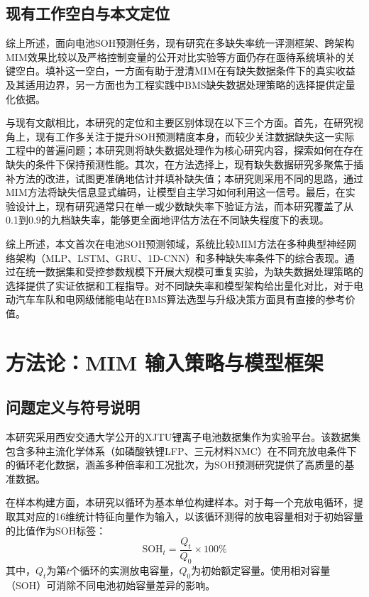 \documentclass[10pt,a4paper]{ctexart}
\begin{document}
\subsection{现有工作空白与本文定位}

综上所述，面向电池SOH预测任务，现有研究在多缺失率统一评测框架、跨架构MIM效果比较以及严格控制变量的公开对比实验等方面仍存在亟待系统填补的关键空白。填补这一空白，一方面有助于澄清MIM在有缺失数据条件下的真实收益及其适用边界，另一方面也为工程实践中BMS缺失数据处理策略的选择提供定量化依据。

与现有文献相比，本研究的定位和主要区别体现在以下三个方面。首先，在研究视角上，现有工作多关注于提升SOH预测精度本身，而较少关注数据缺失这一实际工程中的普遍问题；本研究则将缺失数据处理作为核心研究内容，探索如何在存在缺失的条件下保持预测性能。其次，在方法选择上，现有缺失数据研究多聚焦于插补方法的改进，试图更准确地估计并填补缺失值；本研究则采用不同的思路，通过MIM方法将缺失信息显式编码，让模型自主学习如何利用这一信号。最后，在实验设计上，现有研究通常只在单一或少数缺失率下验证方法，而本研究覆盖了从0.1到0.9的九档缺失率，能够更全面地评估方法在不同缺失程度下的表现。

综上所述，本文首次在电池SOH预测领域，系统比较MIM方法在多种典型神经网络架构（MLP、LSTM、GRU、1D-CNN）和多种缺失率条件下的综合表现。通过在统一数据集和受控参数规模下开展大规模可重复实验，为缺失数据处理策略的选择提供了实证依据和工程指导。对不同缺失率和模型架构给出量化对比，对于电动汽车车队和电网级储能电站在BMS算法选型与升级决策方面具有直接的参考价值。

\section{方法论：MIM 输入策略与模型框架}\label{sec:method}

\subsection{问题定义与符号说明}

本研究采用西安交通大学公开的XJTU锂离子电池数据集作为实验平台\cite{wang2024open,duan2025lithium}。该数据集包含多种主流化学体系（如磷酸铁锂LFP、三元材料NMC）在不同充放电条件下的循环老化数据，涵盖多种倍率和工况批次，为SOH预测研究提供了高质量的基准数据\cite{wang2024open,wang2024pinn}。

在样本构建方面，本研究以循环为基本单位构建样本。对于每一个充放电循环，提取其对应的16维统计特征向量作为输入，以该循环测得的放电容量相对于初始容量的比值作为SOH标签：
\begin{equation}
    \text{SOH}_t = \frac{Q_t}{Q_0} \times 100\%
    \label{eq:soh}
\end{equation}
其中，$Q_t$为第$t$个循环的实测放电容量，$Q_0$为初始额定容量。使用相对容量（SOH）可消除不同电池初始容量差异的影响。
\end{document}
